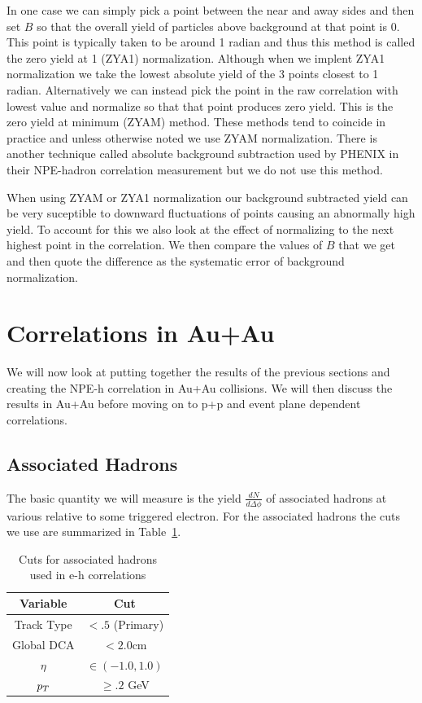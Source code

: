 In one case we can simply pick a point between the near and away sides and then set $B$ so that the overall yield of particles above background at that point is 0. This point is typically taken to be around 1 radian and thus this method is called the zero yield at 1 (ZYA1) normalization. Although when we implent ZYA1 normalization we take the lowest absolute yield of the 3 points closest to 1 radian. Alternatively we can instead pick the point in the raw correlation with lowest value and normalize so that that point produces zero yield. This is the zero yield at minimum (ZYAM) method. These methods tend to coincide in practice and unless otherwise noted we use ZYAM normalization. There is another technique called absolute background subtraction used by PHENIX in their NPE-hadron correlation measurement but we do not use this method. 

When using ZYAM or ZYA1 normalization our background subtracted yield can be very suceptible to downward fluctuations of points causing an abnormally high yield. To account for this we also look at the effect of normalizing to the next highest point in the correlation. We then compare the values of $B$ that we get and then quote the difference as the systematic error of background normalization.

\section{Correlations in Au+Au}

We will now look at putting together the results of the previous sections and creating the NPE-h correlation in Au+Au collisions. We will then discuss the results in Au+Au before moving on to p+p and event plane dependent correlations.

\subsection{Associated Hadrons}

The basic quantity we will measure is the yield $\frac{dN}{d\Delta\phi}$ of associated hadrons at various relative to some triggered electron. For the associated hadrons the cuts we use are summarized in Table~\ref{tab:assohcuts}.

\begin{table}
\centering
\begin{tabular}{|c|c|}
\hline
Variable			& Cut \\
\hline
Track Type          & $< .5$ (Primary) \\
\hline
Global DCA          & $< 2.0$cm \\
\hline
$\eta$              & $\in(-1.0, 1.0)$ \\
\hline
$p_{T}$               & $\geq .2$ GeV \\
\hline
\end{tabular}
\caption[Associated hadron cuts]{Cuts for associated hadrons used in e-h correlations}
\label{tab:assohcuts}
\end{table} 

